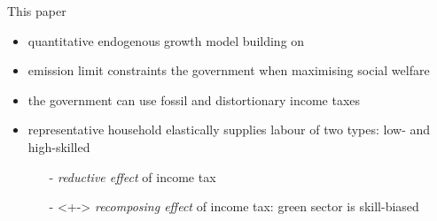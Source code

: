 \documentclass[11pt,aspectratio=169]{beamer}
\begin{document}
\begin{frame}{This paper}
\begin{itemize}
	\item quantitative \alert{endogenous growth} model building on \cite{Fried2018ClimateAnalysis}
	\vspace{3mm}
	\item  \alert{emission limit constraints} the government when  {maximising social welfare}
	\vspace{3mm}
	\item the government can use \alert{fossil} and \alert{distortionary income taxes}
	\vspace{3mm}
	\item  representative household {elastically} supplies labour of two types: \alert{low- and high-skilled } 
	\vspace{2mm}
	\begin{itemize}
		\item[-] \textit{reductive effect} of income tax
		\vspace{1mm}
		\item[-]<+-> \textit{recomposing effect} of income tax: green sector is skill-biased  \citep{Consoli2016DoCapital}
	\end{itemize}
	
\end{itemize}
\end{frame}

\end{document}
